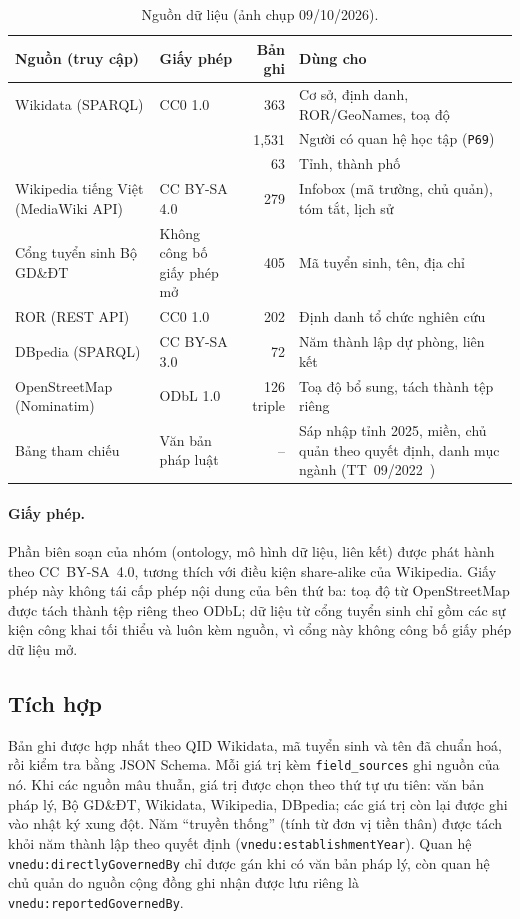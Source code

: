 \documentclass[12pt,a4paper]{article}
\newcommand{\vn}[1]{\texttt{vnedu:\allowbreak #1}}
\begin{document}
\begin{table}[htbp]
\centering\small
\caption{Nguồn dữ liệu (ảnh chụp 09/10/2026).}\label{tab:sources}
\begin{tabularx}{\textwidth}{>{\raggedright\arraybackslash}p{3.1cm}>{\raggedright\arraybackslash}p{2.4cm}r>{\raggedright\arraybackslash}X}
\toprule
Nguồn (truy cập) & Giấy phép & Bản ghi & Dùng cho \\
\midrule
Wikidata (SPARQL) & CC0 1.0 & 363 & Cơ sở, định danh, ROR/GeoNames, toạ độ \\
& & 1{,}531 & Người có quan hệ học tập (\texttt{P69}) \\
& & 63 & Tỉnh, thành phố \\
Wikipedia tiếng Việt (MediaWiki API) & CC BY-SA 4.0 & 279 & Infobox (mã trường, chủ quản), tóm tắt, lịch sử \\
Cổng tuyển sinh Bộ GD\&ĐT & Không công bố giấy phép mở & 405 & Mã tuyển sinh, tên, địa chỉ \\
ROR (REST API) & CC0 1.0 & 202 & Định danh tổ chức nghiên cứu \\
DBpedia (SPARQL) & CC BY-SA 3.0 & 72 & Năm thành lập dự phòng, liên kết \\
OpenStreetMap (Nominatim) & ODbL 1.0 & 126 triple & Toạ độ bổ sung, tách thành tệp riêng \\
Bảng tham chiếu & Văn bản pháp luật & -- & Sáp nhập tỉnh 2025, miền, chủ quản theo quyết định, danh mục ngành
(TT~09/2022~\cite{vn2022tt09}) \\
\bottomrule
\end{tabularx}
\end{table}

\paragraph{Giấy phép.} Phần biên soạn của nhóm (ontology, mô hình dữ liệu, liên kết) được phát hành theo CC~BY-SA~4.0,
tương thích với điều kiện share-alike của Wikipedia. Giấy phép này không tái cấp phép nội dung của bên thứ ba: toạ độ từ
OpenStreetMap được tách thành tệp riêng theo ODbL; dữ liệu từ cổng tuyển sinh chỉ gồm các sự kiện công khai tối thiểu và
luôn kèm nguồn, vì cổng này không công bố giấy phép dữ liệu mở.

\subsection{Tích hợp}
Bản ghi được hợp nhất theo QID Wikidata, mã tuyển sinh và tên đã chuẩn hoá, rồi kiểm tra bằng JSON Schema. Mỗi giá trị
kèm \texttt{field\_sources} ghi nguồn của nó. Khi các nguồn mâu thuẫn, giá trị được chọn theo thứ tự ưu tiên: văn bản
pháp lý, Bộ GD\&ĐT, Wikidata, Wikipedia, DBpedia; các giá trị còn lại được ghi vào nhật ký xung đột. Năm ``truyền thống''
(tính từ đơn vị tiền thân) được tách khỏi năm thành lập theo quyết định (\vn{establishmentYear}). Quan hệ
\vn{directlyGovernedBy} chỉ được gán khi có văn bản pháp lý, còn quan hệ chủ quản do nguồn cộng đồng ghi nhận được lưu
riêng là \vn{reportedGovernedBy}.
\end{document}
